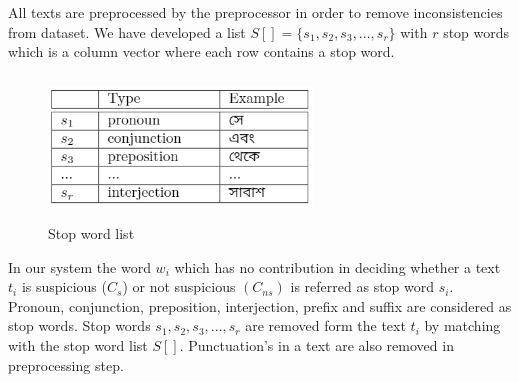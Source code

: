 All texts are preprocessed by the preprocessor in order to remove inconsistencies from dataset. We have developed a list $S[]=\{s_1, s_2, s_3, ..., s_r\}$ with $r$ stop words which is a column vector where each row contains a stop word.\par
\begin{figure}[h!]
    \centering
    \includegraphics[width=7cm,height=3.8cm]{Figures/stop.PNG}
    \caption{Stop word list}
    \label{fig:ss}
\end{figure}
\vspace{0.1cm}
In our system the word $w_i$ which has no contribution in deciding whether a text $t_i$ is suspicious ($C_s$) or not suspicious $(C_{ns})$ is referred as stop word $s_i$. Pronoun, conjunction, preposition, interjection, prefix and suffix are considered as stop words. Stop words $ s_1, s_2, s_3, ..., s_r$ are removed form the text $t_i$ by matching with the stop word list $S[]$. Punctuation's in a text are also removed in preprocessing step.

